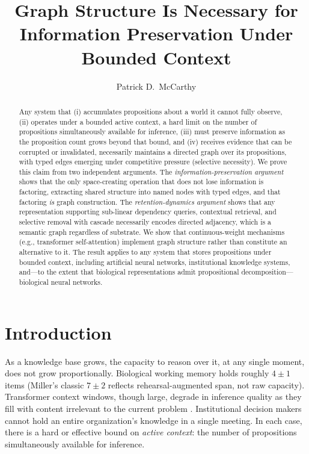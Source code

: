 \documentclass[11pt]{article}
\title{Graph Structure Is Necessary for\\Information Preservation Under Bounded Context}
\author{Patrick D.\ McCarthy}
\date{}
\theoremstyle{definition}
\begin{document}
\maketitle

\begin{abstract}
Any system that (i) accumulates propositions about a world it cannot
fully observe, (ii) operates under a bounded active context, a
hard limit on the number of propositions simultaneously available for
inference, (iii) must preserve information as the proposition
count grows beyond that bound, and (iv) receives evidence that can
be corrupted or invalidated, necessarily maintains a directed graph
over its propositions, with typed edges emerging under competitive
pressure (selective necessity). We prove this claim from two
independent arguments. The \emph{information-preservation argument}
shows that the only space-creating operation that does not lose
information is factoring, extracting shared structure into named
nodes with typed edges, and that factoring \emph{is} graph
construction. The \emph{retention-dynamics argument} shows that any
representation supporting sub-linear dependency queries, contextual
retrieval, and selective removal with cascade necessarily encodes
directed adjacency, which is a semantic graph regardless of substrate.
We show that continuous-weight mechanisms (e.g., transformer
self-attention) implement graph structure rather than constitute an
alternative to it. The result applies to any system that stores
propositions under bounded context, including artificial neural
networks, institutional knowledge systems, and---to the extent that
biological representations admit propositional decomposition---biological
neural networks.
\end{abstract}

\section{Introduction}
\label{sec:intro}

As a knowledge base grows, the capacity to reason over it, at any
single moment, does not grow proportionally. Biological working memory holds
roughly $4 \pm 1$ items \cite{Cowan2001} (Miller's classic
$7 \pm 2$ \cite{Miller1956} reflects rehearsal-augmented span,
not raw capacity). Transformer context windows,
though large, degrade in inference quality as they fill with content
irrelevant to the current problem \cite{Liu2024}. Institutional
decision makers cannot hold an entire organization's knowledge in a
single meeting. In each case, there is a hard or effective bound on
\emph{active context}: the number of propositions simultaneously
available for inference.
\end{document}
